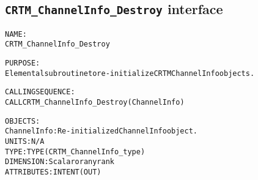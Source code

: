 \subsection{\texttt{CRTM\_ChannelInfo\_Destroy} interface}
  \label{sec:CRTM_ChannelInfo_Destroy_interface}
  \begin{alltt}
 
  NAME:
        CRTM_ChannelInfo_Destroy
 
  PURPOSE:
        Elemental subroutine to re-initialize CRTM ChannelInfo objects.
 
  CALLING SEQUENCE:
        CALL CRTM_ChannelInfo_Destroy( ChannelInfo )
 
  OBJECTS:
        ChannelInfo:    Re-initialized ChannelInfo object.
                        UNITS:      N/A
                        TYPE:       TYPE(CRTM_ChannelInfo_type)
                        DIMENSION:  Scalar or any rank
                        ATTRIBUTES: INTENT(OUT)
 
  \end{alltt}

